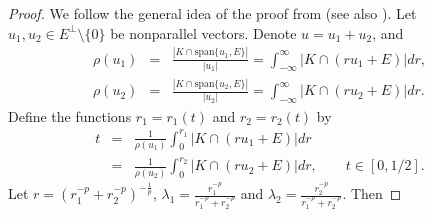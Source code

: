 \documentclass[12pt]{amsart} %
\renewcommand{\[}{\left[}
\renewcommand{\(}{\left(}
\renewcommand{\]}{\right]}
\renewcommand{\)}{\right)}
\newcommand{\la}{\lambda}
\begin{document}
\begin{proof} We follow the general idea of the proof from \cite{MP}  (see also \cite[p.311]{Ga2}).
Let $u_1, u_2 \in  E^\perp \setminus \{0\}$ be nonparallel vectors. Denote $u=u_1+u_2$,   and
\begin{eqnarray*}
\rho (u_1) &=&\frac{ |K \cap \mbox{span}\{u_1,E\}|}{|u_1|} = \int_{-\infty}^{\infty}
\left|K \cap (r u_1+E)\right|dr, \\
\rho (u_2) &=&\frac{ |K \cap \mbox{span}\{u_2,E\}| }{|u_2|}= \int_{-\infty}^{\infty} \left|K
\cap (r u_2+E)\right|dr.
\end{eqnarray*}
Define the functions $r_1 = r_1(t)$ and $r_2 = r_2(t)$ by
\begin{eqnarray*}
t &=& \frac{1}{\rho (u_1)} \int_0^{r_1} \left|K \cap(r
u_1+E)\right|dr \\
&=& \frac{1}{\rho (u_2)} \int_0^{r_2} \left|K \cap(r
u_2+E)\right|dr ,\qquad t\in [0,1/2].
\end{eqnarray*}
Let $r = \left( r_1^{-p} + r_2^{-p} \right)^{-\frac{1}{p}}$, $\la_1
= \frac{r_1^{-p}}{r_1^{-p} + r_2^{-p}}$ and $\la_2 =
\frac{r_2^{-p}}{r_1^{-p} + r_2^{-p}}$. Then


\end{proof}
\end{document}

